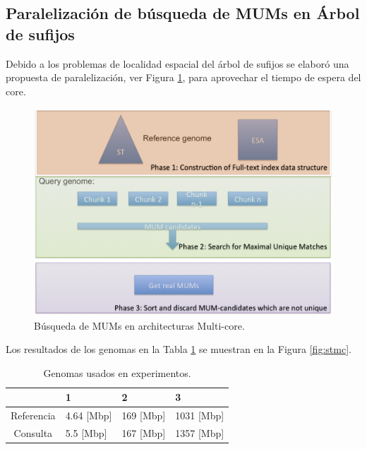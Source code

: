 \documentclass[12pt,a4paper]{article}
\begin{document}
\subsection{Paralelización de búsqueda de MUMs en Árbol de sufijos}
Debido a los problemas de localidad espacial del árbol de sufijos se elaboró una propuesta de paralelización, ver Figura \ref{phases}, para aprovechar el tiempo de espera del core. 
 \begin{figure}[h!] 
   \centering 
   \includegraphics[scale=0.5]{phases.eps} 
    \caption{Búsqueda de MUMs en architecturas Multi-core.} 
   \label{phases} 
 \end{figure}
 \vspace{0.5cm}
Los resultados de los genomas en la Tabla \ref{genomes} se muestran en la Figura \ref{fig:stmc}.
\begin{table} 
\centering
\caption{Genomas usados en experimentos.}
\label{genomes}
\begin{tabular}{|c|l|l|l|} \hline
  & 1 & 2 & 3 \\ \hline
  Referencia & 4.64 [Mbp] & 169 [Mbp] & 1031 [Mbp] \\ \hline
  Consulta & 5.5 [Mbp] & 167 [Mbp] & 1357 [Mbp] \\ 
  \hline
\end{tabular}
\end{table}
\end{document}
